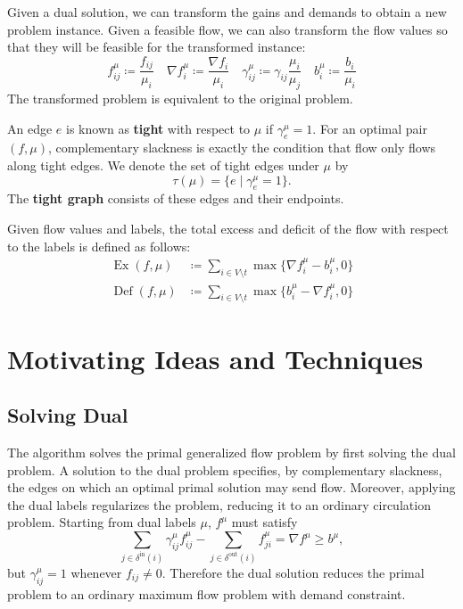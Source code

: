 \documentclass[11pt]{article}
\theoremstyle{definition}
\theoremstyle{definition}
\newcommand{\fu}{f^{\mu}}
\newcommand{\nfiu}{\nabla \fu_i}
\newcommand{\biu}{b_{i}^{\mu}}
\newcommand{\geu}{\gamma_e^{\mu}}
\newcommand{\giij}{\gamma_{ij}^{\mu}}
\newcommand{\din}{\delta^{\text{in}}}
\newcommand{\dout}{\delta^{\text{out}}}
\DeclareMathOperator{\Ex}{Ex}
\DeclareMathOperator{\Def}{Def}
\newcommand{\todo}[1]{}%
\begin{document}
	Given a dual solution, we can transform the gains and demands to obtain a new
	problem instance. Given a feasible flow, we can also transform the flow values
	so that they will be feasible for the transformed instance:
	\[ f_{ij}^\mu \coloneqq \frac{f_{ij}}{\mu_i} \quad
	\nabla f_i^\mu \coloneqq \frac{\nabla f_i }{\mu_i} \quad
	\gamma_{ij}^\mu \coloneqq \gamma_{ij} \frac{\mu_i}{\mu_j} \quad
	b_i^\mu \coloneqq \frac{b_i}{\mu_i} \]
	The transformed problem is equivalent to the original problem.
	
	An edge $e$ is known as \textbf{tight} with respect to $\mu$ if $\gamma_e^\mu =1$.
	For an optimal pair $(f, \mu)$, complementary slackness is exactly the condition that
	flow only flows along tight edges. We denote the set of tight edges under
	$\mu$ by
    \[ \tau(\mu) = \{e \mid \geu = 1\}. \]
    The \textbf{tight graph} consists of these edges and their endpoints.
	
	Given flow values and labels, the total excess and deficit of the flow with respect
	to the labels is defined as follows:
	\begin{align*}
	\Ex(f,\mu)  &\coloneqq \sum_{i \in V \setminus t} \max \{ \nfiu - \biu, 0 \} \\
	\Def(f,\mu) &\coloneqq \sum_{i \in V \setminus t} \max \{ \biu - \nfiu, 0 \}
	\end{align*}
  
\section{Motivating Ideas and Techniques}
\label{sec:motivate}
	\subsection{Solving Dual}
            
	The algorithm \todo{how about "both"?} solves the primal generalized flow problem by first solving the dual problem.
    A solution to the dual problem specifies, by complementary slackness, the edges on which an optimal
    primal solution may send flow. Moreover, applying the dual labels regularizes the problem, reducing
    it to an ordinary circulation problem. Starting from dual labels $\mu$, $f^{\mu}$ must satisfy
    \[ \sum_{j \in \din(i)} \giij \fu_{ij} - \sum_{j \in \dout(i)} \fu_{ji}
     = \nabla f^{\mu} \geq b^{\mu}, \]
    but $\giij = 1$ whenever $f_{ij} \neq 0$. Therefore the dual solution reduces the primal problem
    to an ordinary maximum flow problem with demand constraint.
    
\end{document}
